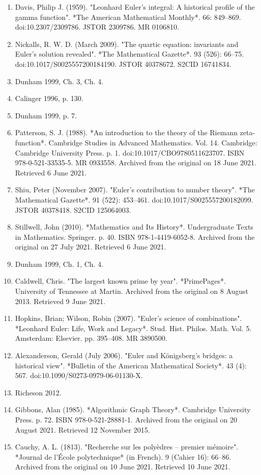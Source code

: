 \begin{enumerate}
\item Davis, Philip J. (1959). "Leonhard Euler's integral: A historical profile of the gamma function". *The American Mathematical Monthly*. 66: 849–869. doi:10.2307/2309786. JSTOR 2309786. MR 0106810.
\item Nickalls, R. W. D. (March 2009). "The quartic equation: invariants and Euler's solution revealed". *The Mathematical Gazette*. 93 (526): 66–75. doi:10.1017/S0025557200184190. JSTOR 40378672. S2CID 16741834.
\item Dunham 1999, Ch. 3, Ch. 4.
\item Calinger 1996, p. 130.
\item Dunham 1999, p. 7.
\item Patterson, S. J. (1988). *An introduction to the theory of the Riemann zeta-function*. Cambridge Studies in Advanced Mathematics. Vol. 14. Cambridge: Cambridge University Press. p. 1. doi:10.1017/CBO9780511623707. ISBN 978-0-521-33535-5. MR 0933558. Archived from the original on 18 June 2021. Retrieved 6 June 2021.
\item Shiu, Peter (November 2007). "Euler's contribution to number theory". *The Mathematical Gazette*. 91 (522): 453–461. doi:10.1017/S0025557200182099. JSTOR 40378418. S2CID 125064003.
\item Stillwell, John (2010). *Mathematics and Its History*. Undergraduate Texts in Mathematics. Springer. p. 40. ISBN 978-1-4419-6052-8. Archived from the original on 27 July 2021. Retrieved 6 June 2021.
\item Dunham 1999, Ch. 1, Ch. 4.
\item Caldwell, Chris. "The largest known prime by year". *PrimePages*. University of Tennessee at Martin. Archived from the original on 8 August 2013. Retrieved 9 June 2021.
\item Hopkins, Brian; Wilson, Robin (2007). "Euler's science of combinations". *Leonhard Euler: Life, Work and Legacy*. Stud. Hist. Philos. Math. Vol. 5. Amsterdam: Elsevier. pp. 395–408. MR 3890500.
\item  Alexanderson, Gerald (July 2006). "Euler and Königsberg's bridges: a historical view". *Bulletin of the American Mathematical Society*. 43 (4): 567. doi:10.1090/S0273-0979-06-01130-X.
\item Richeson 2012.
\item Gibbons, Alan (1985). *Algorithmic Graph Theory*. Cambridge University Press. p. 72. ISBN 978-0-521-28881-1. Archived from the original on 20 August 2021. Retrieved 12 November 2015.
\item Cauchy, A. L. (1813). "Recherche sur les polyèdres – premier mémoire". *Journal de l'École polytechnique* (in French). 9 (Cahier 16): 66–86. Archived from the original on 10 June 2021. Retrieved 10 June 2021.

\end{enumerate}
